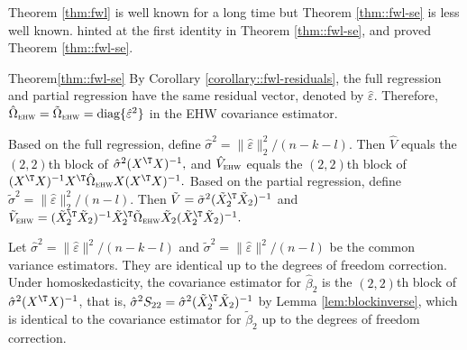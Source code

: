  
Theorem \ref{thm:fwl} is well known for a long time but Theorem \ref{thm::fwl-se} is less well known. \citet{lovell1963seasonal} hinted at the first identity in Theorem \ref{thm::fwl-se}, and 
\citet{ding2021frisch} proved Theorem \ref{thm::fwl-se}. 



\begin{myproof}{Theorem}{\ref{thm::fwl-se}}
By Corollary \ref{corollary::fwl-residuals}, the full regression and partial regression have the same residual vector, denoted by $\hat{ \varepsilon}$. Therefore, 
$\hat{\Omega}_\textsc{ehw} = \tilde{\Omega}_\textsc{ehw} = \text{diag}\{ \hat{\varepsilon}^2\}$ in the EHW covariance estimator. 

Based on the full regression, define $\hat{\sigma}^2 = \| \hat{ \varepsilon} \|_2^2/(n-k-l)$.  Then $\hat{V}$ equals the $(2,2)$th block of
$
  \hat{\sigma}^2 (X^{\T} X)^{-1} ,
$
and $\hat{V}_{\textsc{ehw}}$ equals the $(2,2)$th block of
$
  (X^{\T} X)^{-1} X^{\T} \hat{\Omega}_\textsc{ehw} X (X^{\T}X)^{-1}.
$ 
Based on the partial regression, define $\tilde{\sigma}^2 = \| \hat{\varepsilon}\|_2^2/(n-l)$.  Then $
\tilde{V} =   \tilde{\sigma}^2 ( \tilde{X}_2 ^{\T} \tilde{X}_2)^{-1} 
$  and $
\tilde{V}_{\textsc{ehw}} = ( \tilde{X}_2 ^{\T} \tilde{X}_2)^{-1}  \tilde{X}_2^{\T}  \tilde{\Omega}_\textsc{ehw} \tilde{X}_2  ( \tilde{X}_2 ^{\T} \tilde{X}_2)^{-1}. 
$

 



Let $\hat{\sigma}^2 = \| \hat{ \varepsilon} \|^2/(n-k-l)$ and $\tilde{\sigma}^2 = \|  \hat{ \varepsilon} \|^2/(n-l)$ be the common variance estimators. They are identical up to the degrees of freedom correction. 
Under homoskedasticity, the covariance estimator for $\hat{\beta}_2$ is the $(2,2)$th block of $\hat{\sigma}^2 (X ^{\T} X)^{-1}$, that is, $ \hat{\sigma}^2   S_{22} = \hat{\sigma}^2  ( \tilde{X}_2 ^{\T} \tilde{X}_2 )^{-1}$ by Lemma \ref{lem:blockinverse}, which is identical to the covariance estimator for $\tilde{\beta}_2$ up to the degrees of freedom correction. 



\end{myproof}
